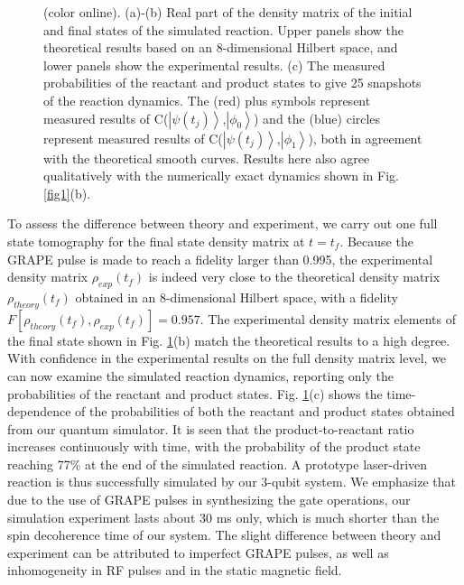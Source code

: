 \documentclass[twocolumn,showpacs,twoside,10pt,prl]{revtex4}
\begin{document}
\begin{figure}[htb]
\setlength{\abovecaptionskip}{-0.35cm}
\caption{\footnotesize{(color online). (a)-(b) Real part of the density matrix of the initial and final states of the simulated reaction.
Upper panels show the theoretical results based on an 8-dimensional Hilbert space, and lower panels show the experimental results.
(c) The measured probabilities of the reactant and product states to give 25 snapshots of the reaction dynamics.   The (red) plus symbols represent measured results of C($\left\vert \psi(t_j)\right\rangle$,$\left\vert \phi_{0} \right\rangle$) and the (blue) circles represent measured results of C($\left\vert \psi(t_j) \right\rangle$,$\left\vert \phi_{1} \right\rangle$), both in agreement with the theoretical smooth curves.  Results here also agree qualitatively
with the numerically exact dynamics shown in Fig. \ref{fig1}(b).}}\label{tomo}
\end{figure}

 To assess the difference between theory and experiment,  we carry out one full state tomography for the final state density matrix  at $t=t_f$.
 Because the GRAPE pulse is made to reach a fidelity larger than 0.995, the experimental density matrix $\rho_{exp}(t_f)$
 is indeed very close to the  theoretical density matrix $\rho_{theory}(t_f)$ obtained in an 8-dimensional Hilbert space, with a fidelity $F[\rho_{theory}(t_f),\rho_{exp}(t_f)]=0.957$. The experimental density matrix elements of the final state shown in Fig. \ref{tomo}(b) match the theoretical results to a high degree. With confidence in the experimental results on the full density matrix level, we can now examine the simulated reaction dynamics, reporting only the probabilities of the reactant and product states.
 Fig. \ref{tomo}(c) shows the time-dependence of the probabilities of both the reactant and product states obtained from our quantum simulator.
 It is seen that the product-to-reactant ratio
  increases continuously with time, with the probability of the product state reaching 77\% at the end of the simulated reaction. 
    A prototype laser-driven reaction is thus successfully simulated by our 3-qubit system.
    We emphasize that due to the use of GRAPE pulses in synthesizing the gate operations, our simulation experiment lasts about 30 ms only, which is much shorter than the spin decoherence time of our system.
  The slight difference between theory and experiment can be attributed to imperfect GRAPE pulses, as well as inhomogeneity in RF pulses and in the static magnetic field.

\end{document}
